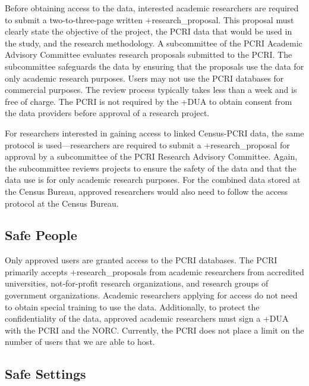 \documentclass[
]{book}
\begin{document}
Before obtaining access to the data, interested academic researchers are required to submit a two-to-three-page written +research\_proposal\textbar. This proposal must clearly state the objective of the project, the PCRI data that would be used in the study, and the research methodology. A subcommittee of the PCRI Academic Advisory Committee evaluates research proposals submitted to the PCRI. The subcommittee safeguards the data by ensuring that the proposals use the data for only academic research purposes. Users may not use the PCRI databases for commercial purposes. The review process typically takes less than a week and is free of charge. The PCRI is not required by the +DUA\textbar{} to obtain consent from the data providers before approval of a research project.

For researchers interested in gaining access to linked Census-PCRI data, the same protocol is used---researchers are required to submit a +research\_proposal\textbar{} for approval by a subcommittee of the PCRI Research Advisory Committee. Again, the subcommittee reviews projects to ensure the safety of the data and that the data use is for only academic research purposes. For the combined data stored at the Census Bureau, approved researchers would also need to follow the access protocol at the Census Bureau.

\hypertarget{safe-people-3}{%
\subsection{Safe People}\label{safe-people-3}}

Only approved users are granted access to the PCRI databases. The PCRI primarily accepts +research\_proposals\textbar{} from academic researchers from accredited universities, not-for-profit research organizations, and research groups of government organizations. Academic researchers applying for access do not need to obtain special training to use the data. Additionally, to protect the confidentiality of the data, approved academic researchers must sign a +DUA\textbar{} with the PCRI and the NORC. Currently, the PCRI does not place a limit on the number of users that we are able to host.

\hypertarget{safe-settings-3}{%
\subsection{Safe Settings}\label{safe-settings-3}}
\end{document}
